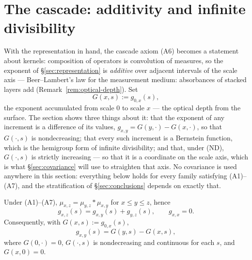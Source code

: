 
\section{The cascade: additivity and infinite divisibility}\label{sec:cascade}

With the representation in hand, the cascade axiom (A6) becomes a statement about
kernels: composition of operators is convolution of measures, so the exponent of
\S\ref{sec:representation} is \emph{additive} over adjacent intervals of the scale axis ---
Beer--Lambert's law for the measurement medium: absorbances of stacked layers add
(Remark~\ref{rem:optical-depth}). Set
\[
  G(x, s) := g_{0,x}(s),
\]
the exponent accumulated from scale $0$ to scale $x$ --- the optical depth from the
surface. The section shows three things about
it: that the exponent of any increment is a difference of its values,
$g_{x,y} = G(y,\cdot) - G(x,\cdot)$, so that $G(\cdot, s)$ is nondecreasing; that every such
increment is a Bernstein function, which is the hemigroup form of infinite divisibility; and
that, under (ND), $G(\cdot, s)$ is strictly increasing --- so that
it is a coordinate on the scale axis, which is what \S\ref{sec:covariance} will use to
straighten that axis. No covariance is used anywhere in this section: everything below holds
for every family satisfying (A1)--(A7), and the stratification of \S\ref{sec:conclusions}
depends on exactly that.

\begin{lemma}[additivity]\label{lem:additivity}
Under (A1)--(A7), $\mu_{x,z} = \mu_{y,z} * \mu_{x,y}$ for $x \le y \le z$, hence
\[
  g_{x,z}(s) = g_{x,y}(s) + g_{y,z}(s), \qquad g_{x,x} = 0.
\]
Consequently, with $G(x, s) := g_{0,x}(s)$,
\[
  g_{x,y}(s) = G(y, s) - G(x, s),
\]
where $G(0, \cdot) = 0$, $G(\cdot, s)$ is nondecreasing and continuous for each $s$, and
$G(x, 0) = 0$.
\end{lemma}

